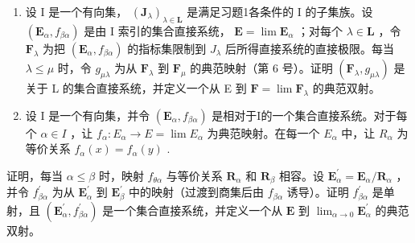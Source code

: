 \begin{enumerate}
\def\labelenumi{\arabic{enumi}.}
\setcounter{enumi}{5}
\item
  设 I 是一个有向集， \((\mathbf{J}_{\lambda})_{\lambda \in \mathbf{L}}\) 是满足习题1各条件的 I 的子集族。设 \((\mathbf{E}_{\alpha}, f_{\beta \alpha})\) 是由 I 索引的集合直接系统， \(\mathbf{E} = \lim \mathbf{E}_{\alpha}\) ；对每个 \(\lambda \in \mathbf{L}\) ，令 \(\mathbf{F}_{\lambda}\) 为把 \((\mathbf{E}_{\alpha}, f_{\beta \alpha})\) 的指标集限制到 \(J_{\lambda}\) 后所得直接系统的直接极限。每当 \(\lambda \leqslant \mu\) 时，令 \(g_{\mu \lambda}\) 为从 \(\mathbf{F}_{\lambda}\) 到 \(\mathbf{F}_{\mu}\) 的典范映射（第 6 号）。证明 \((\mathbf{F}_{\lambda}, g_{\mu \lambda})\) 是关于 L 的集合直接系统，并定义一个从 E 到 \(\mathbf{F} = \lim \mathbf{F}_{\lambda}\) 的典范双射。
\item
  设 I 是一个有向集，并令 \((\mathbf{E}_{\alpha}, f_{\beta\alpha})\) 是相对于I的一个集合直接系统。对于每个 \(\alpha \in I\) ，让 \(f_{\alpha}: E_{\alpha} \to E = \lim E_{\alpha}\) 为典范映射。在每一个 \(E_{\alpha}\) 中，让 \(R_{\alpha}\) 为等价关系 \(f_{\alpha}(x) = f_{\alpha}(y)\) .
\end{enumerate}

证明，每当 \(\alpha \leqslant \beta\) 时，映射 \(f_{\theta \alpha}\) 与等价关系 \(\mathbf{R}_{\alpha}\) 和 \(\mathbf{R}_{\beta}\) 相容。设 \(\mathbf{E}_{\alpha}^{\prime} = \mathbf{E}_{\alpha} / \mathbf{R}_{\alpha}\) ，并令 \(f_{\beta \alpha}^{\prime}\) 为从 \(\mathbf{E}_{\alpha}^{\prime}\) 到 \(\mathbf{E}_{\beta}^{\prime}\) 中的映射（过渡到商集后由 \(f_{\beta \alpha}\) 诱导）。证明 \(f_{\beta \alpha}^{\prime}\) 是单射，且 \((\mathbf{E}_{\alpha}^{\prime}, f_{\beta \alpha}^{\prime})\) 是一个集合直接系统，并定义一个从 \(\mathbf{E}\) 到 \(\lim_{\alpha \to 0} \mathbf{E}_{\alpha}^{\prime}\) 的典范双射。

